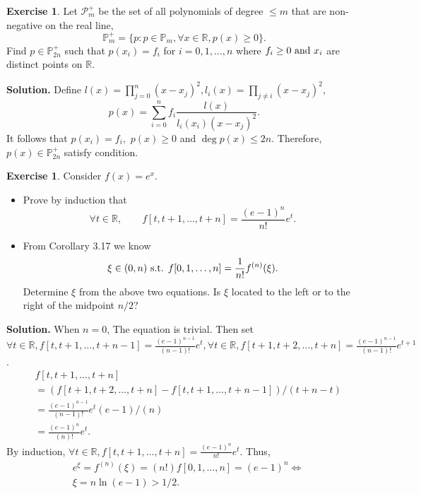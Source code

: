 \message{ !name(hw2-21935004-\unexpanded{谭焱}.tex)}\documentclass[a4paper]{book}
\newenvironment{solution}%
{\noindent\textbf{Solution.}}%
{\qedhere}
\numberwithin{equation}{chapter}
\theoremstyle{definition}
\newtheorem{exc}[exm]{Exercise}
\begin{document}
\begin{exc}
  Let $\mathcal{P}^+_m$ be the set of all polynomials of degree $\leq m$ that are non-negative on the real line,
  \begin{equation}
    \label{eq:2:2:1}
    \mathbb{P}^+_m = \{ p : p \in \mathbb{P}_m, \forall x \in \mathbb{R}, p(x) \geq 0 \}.
  \end{equation}
  Find $p \in \mathbb{P}^+_{2n}$ such that $p(x_i) = f_i$ for $i = 0,1,\dots,n $ where $f_i \geq 0 \textmd{ and } x_i $ are distinct points on $\mathbb{R}$.
\end{exc}

\begin{solution}
  Define $l(x) = \prod^n_{j = 0}(x - x_j)^2, l_i(x) = \prod_{j \neq i}(x - x_j)^2, $
  \[ p(x) = \sum^n_{i = 0} f_i\frac{l(x)}{l_i(x_i)(x - x_j)^2}. \]
  It follows that $p(x_i) = f_i, $ $p(x) \geq 0$ and $\deg p(x) \leq 2n$. Therefore, $p(x) \in \mathbb{P}^+_{2n}$ satisfy condition.
\end{solution}

\begin{exc}
  Consider $f(x) = e^x$.
  \begin{itemize}
  \item Prove by induction that
    \[ \forall t \in \mathbb{R}, \qquad f[t,t+1,\dots, t+n] = \frac{(e-1)^n}{n!}e^t .\]
  \item From Corollary 3.17 we know
    \[ \xi \in (0,n) \textmd{ s.t. } f[0,1,\dots, n] = \frac{1}{n!}f^{(n)}(\xi) .\]
    Determine $\xi$ from the above two equations. Is $\xi$ located to the left or to the right of the midpoint $n/2$?
  \end{itemize}
\end{exc}

\begin{solution}
  When $n = 0$, The equation is trivial. Then set $\forall t \in \mathbb{R}, f[t,t+1,\dots, t+n-1] = \frac{(e-1)^{n-1}}{(n-1)!}e^t, \forall t \in \mathbb{R},f[t+1,t+2,\dots, t+n] = \frac{(e-1)^{n-1}}{(n-1)!}e^{t+1}$.
  \begin{align*}
    &f[t,t+1,\dots, t+n] \\
    &=(f[t+1,t+2,\dots, t+n] - f[t,t+1,\dots, t+n-1])/(t+n - t) \\
    &=\frac{(e-1)^{n-1}}{(n-1)!}e^t(e - 1)/(n) \\
    &=\frac{(e-1)^{n}}{(n)!}e^t.
  \end{align*}
  By induction, $ \forall t \in \mathbb{R}, f[t,t+1,\dots, t+n] = \frac{(e-1)^n}{n!}e^t $.
  Thus,
  \begin{align*}
    &e^{\xi} = f^{(n)}(\xi) = (n!)f[0,1,\dots,n] = (e-1)^n \Longleftrightarrow \\
    &\xi = n \ln(e-1) > 1/2.
  \end{align*}
\end{solution}
\end{document}
